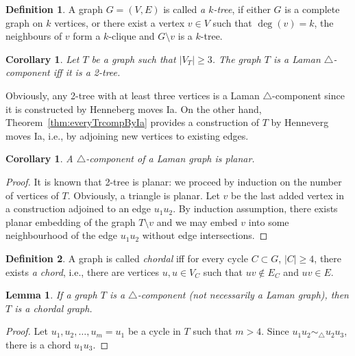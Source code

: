 \documentclass[a4paper, 11pt]{article}
\newcommand{\trcomp}{$\triangle$-component}
\newtheorem{lem}[thm]{Lemma}
\newtheorem{cor}[thm]{Corollary}
\theoremstyle{definition}
\newtheorem{defn}{Definition}[section]
\begin{document}
\begin{defn}
A graph $G=(V,E)$ is called \emph{a $k$-tree}, if either $G$ is a complete graph on $k$ vertices, or there exist a vertex $v\in V$ such that $\deg(v)=k$, the neighbours of $v$ form a $k$-clique and $G\setminus v$ is a $k$-tree.
\end{defn}

\begin{cor}
Let $T$ be a graph such that $|V_T|\geq 3$. The graph $T$ is a Laman \trcomp{} iff it is a 2-tree.
\end{cor}
Obviously, any 2-tree with at least three vertices is a Laman \trcomp{} since it is constructed by Henneberg moves Ia. On the other hand, Theorem~\ref{thm:everyTrcompByIa} provides a construction of $T$ by Henneverg moves Ia, i.e., by adjoining new vertices to existing edges.

\begin{cor}
A \trcomp{} of a Laman graph is planar.
\end{cor}
\begin{proof}
It is known that 2-tree is planar: we proceed by induction on the number of vertices of $T$. Obviously, a triangle is planar. Let $v$ be the last added vertex in a construction adjoined  to an edge $u_1u_2$. By induction assumption, there exists planar embedding of the graph $T\setminus v$ and we may embed $v$ into some neighbourhood of the edge $u_1u_2$ without edge intersections.
\end{proof}

\begin{defn}
A graph is called \emph{chordal} iff for every cycle $C\subset G$, $|C|\geq 4$, there exists \emph{a chord}, i.e., there are vertices $u,u\in V_C$ such that $uv\notin E_C$ and $uv\in E$.
\end{defn}

\begin{lem}
If a graph $T$ is a \trcomp{} (not necessarily a Laman graph), then $T$ is a chordal graph.
\end{lem}
\begin{proof}
Let $u_1, u_2, \dots, u_m=u_1$ be a cycle in $T$ such that $m>4$. Since $u_1u_2 \sim_{\!\!\bigtriangleup} u_2u_3$, there is a chord $u_1u_3$.
\end{proof}
\end{document}
